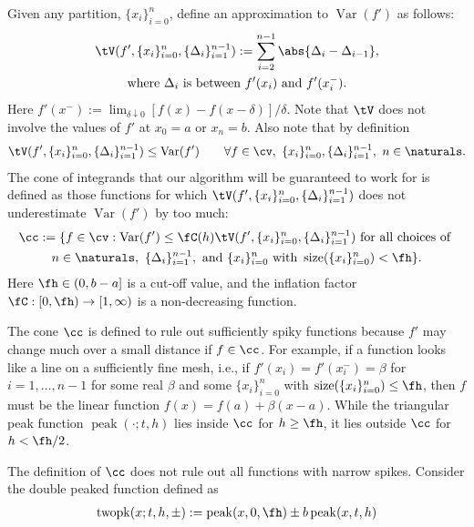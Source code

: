 \documentclass[]{article}
\DeclareMathOperator{\Var}{Var}
\DeclareMathOperator{\size}{size}
\theoremstyle{definition}
\theoremstyle{remark}
\DeclareMathOperator{\tri}{peak}
\DeclareMathOperator{\twopk}{twopk}
\newcommand{\datasites}{\{x_i\}_{i=0}^n}
\begin{document}
Given any partition, $\datasites$, define an approximation to $\Var(f')$ as follows:
\begin{multline*}
\tV(f',\datasites,\{\Delta_{i}\}_{i=1}^{n-1}) : = \sum_{i=2}^{n-1} \abs{\Delta_{i} - \Delta_{i-1}}, \\
\text{where } \Delta_{i} \text{ is between } f'(x_i) \text{ and } f'(x_i^-).
\end{multline*}
Here $f'(x^-):= \lim_{\delta \downarrow 0} [f(x) - f(x-\delta)]/\delta$.  Note that $\tV$ does not involve the values of $f'$ at $x_0=a$ or $x_n=b$.  Also note that by definition
\[
\tV(f',\datasites,\{\Delta_{i}\}_{i=1}^{n-1}) \le \Var(f') \qquad \forall f \in \cv, \ \datasites, \{\Delta_{i}\}_{i=1}^{n-1}, \ n \in \naturals.
\]
The cone of integrands that our algorithm will be guaranteed to work for is defined as those functions for which $\tV(f',\datasites,\{\Delta_{i}\}_{i=1}^{n-1})$ does not underestimate $\Var(f')$ by too much:
\begin{multline} \label{conedef}
\cc := \{ f \in \cv : \Var(f') \le \fC(h) \tV(f',\datasites,\{\Delta_{i}\}_{i=1}^{n-1}) \text{ for all choices of } \\
n \in \naturals, \ \{\Delta_{i}\}_{i=1}^{n-1}, \text{ and }\datasites \text{ with } \size(\datasites) < \fh \}.
\end{multline}
Here $\fh \in (0, b-a]$ is a cut-off value, and the inflation factor $\fC:[0,\fh) \to [1,\infty)$ is a non-decreasing function.

The cone $\cc$ is defined to rule out sufficiently spiky functions because $f'$ may change much over a small distance if $f \in \cc$.  For example, if a function looks like a line on a sufficiently fine mesh, i.e., if $f'(x_i)=f'(x_i^-)=\beta$ for $i=1, \ldots, n-1$ for some real $\beta$ and some $\datasites$ with $\size(\datasites) \le \fh$, then $f$ must be the linear function $f(x)= f(a) + \beta(x-a)$.  While the triangular peak function $\tri(\cdot;t,h)$ lies inside $\cc$ for $h \ge \fh$, it lies outside $\cc$ for $h < \fh/2$.

The definition of $\cc$ does not rule out all functions with narrow spikes.  Consider the double peaked function defined as
\begin{subequations} \label{twopkdef}
\begin{gather}
\twopk(x;t,h,\pm):= \tri(x,0,\fh) \pm b\tri(x,t,h) \\
\end{gather}
\end{subequations}
\end{document}
